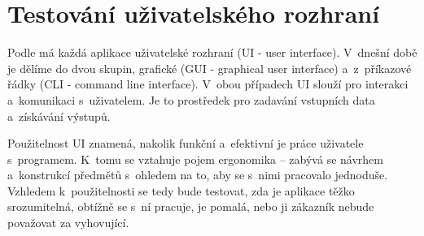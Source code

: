 		\section{Testování uživatelského rozhraní}
		Podle \citep{Patton} má každá aplikace uživatelské rozhraní (UI - user interface). V~dnešní době je dělíme do dvou skupin, grafické (GUI - graphical user interface) a~z~příkazové řádky (CLI - command line interface). V~obou případech UI slouží pro interakci a~komunikaci s~uživatelem. Je to prostředek pro zadavání vstupních data a~získávání výstupů.
		
		Použitelnost UI znamená, nakolik funkční a~efektivní je práce uživatele s~programem. K~tomu se vztahuje pojem ergonomika -- zabývá se návrhem a~konstrukcí předmětů s~ohledem na to, aby se s~nimi pracovalo jednoduše. Vzhledem k~použitelnosti se tedy bude testovat, zda je aplikace těžko srozumitelná, obtížně se s~ní pracuje, je pomalá, nebo ji zákazník nebude považovat za vyhovující.
		
